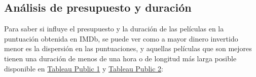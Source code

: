 \documentclass{article}
\begin{document}
\begin{figure}[h]
\centering
{}
\end{figure}


\subsection{Análisis de presupuesto y duración}

Para saber si influye el presupuesto y la duración de las películas en la puntuación obtenida en IMDb, se puede ver como a mayor dinero invertido menor es la dispersión en las puntuaciones, y aquellas películas que son mejores tienen una duración de menos de una hora o de longitud más larga posible disponible en \href{https://public.tableau.com/profile/javier6580\#!/vizhome/proyecto_fin_de_master_dataset/rating_budget}{Tableau Public 1} y \href{https://public.tableau.com/profile/javier6580\#!/vizhome/proyecto_fin_de_master_dataset/rating_budget}{Tableau Public 2}:
\end{document}
